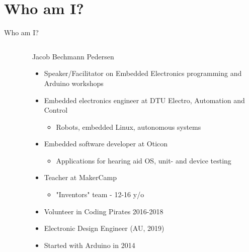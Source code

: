 \documentclass[aspectratio=169]{beamer}
\begin{document}
\section{Who am I?}
\begin{frame}[fragile]{Who am I?}
\begin{columns}
	\begin{column}{0.4\textwidth}
		\begin{center}
		\vspace{0.05\textwidth}
		\begin{columns}
			\begin{column}{0.33\textwidth}
			\end{column}
			\begin{column}{0.33\textwidth}
			\end{column}
			\begin{column}{0.33\textwidth}
			\end{column}
		\end{columns}
		\end{center}
	\end{column}	

	\begin{column}{0.6\textwidth}
	\begin{textBox}
		Jacob Bechmann Pedersen
			\begin{itemize}
				\item Speaker/Facilitator on Embedded Electronics programming and Arduino workshops
				\item Embedded electronics engineer at DTU Electro, Automation and Control
					\begin{itemize}
						\item Robots, embedded Linux, autonomous systems
					\end{itemize}
				\item Embedded software developer at Oticon
					\begin{itemize}
						\item Applications for hearing aid OS, unit- and device testing
					\end{itemize}
				\item Teacher at MakerCamp
					\begin{itemize}
						\item "Inventors" team - 12-16 y/o
					\end{itemize}
				\item Volunteer in Coding Pirates 2016-2018
				\item Electronic Design Engineer (AU, 2019)
				\item Started with Arduino in 2014
			\end{itemize}
	\end{textBox}
	\end{column}
\end{columns}	
\end{frame}
\end{document}
